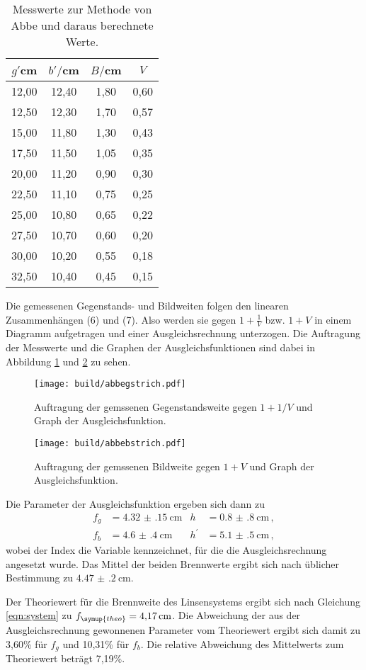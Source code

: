 \begin{table}[htp]
	\begin{center}
    \caption{Messwerte zur Methode von Abbe und daraus berechnete Werte.}
    \label{tab:abbe}
		\begin{tabular}{cccc}
		\toprule
			{$g'$cm} & {$b'/$cm} & {$B/$cm} & {$V$}\\
			\midrule
			12,00 & 12,40 & 1,80 & 0,60\\
			12,50 & 12,30 & 1,70 & 0,57\\
			15,00 & 11,80 & 1,30 & 0,43\\
			17,50 & 11,50 & 1,05 & 0,35\\
			20,00 & 11,20 & 0,90 & 0,30\\
			22,50 & 11,10 & 0,75 & 0,25\\
			25,00 & 10,80 & 0,65 & 0,22\\
			27,50 & 10,70 & 0,60 & 0,20\\
			30,00 & 10,20 & 0,55 & 0,18\\
			32,50 & 10,40 & 0,45 & 0,15\\
		\bottomrule
		\end{tabular}
	\end{center}
\end{table}

Die gemessenen Gegenstands- und Bildweiten folgen den linearen Zusammenhängen
(6) und (7). Also werden sie gegen $1+\frac{1}{V}$ bzw. $1+V$ in einem Diagramm
aufgetragen und einer Ausgleichsrechnung unterzogen. Die Auftragung der Messwerte
und die Graphen der Ausgleichsfunktionen sind dabei in Abbildung \ref{fig:gstrich}
und \ref{fig:bstrich} zu sehen.

\begin{figure}%
  \centering
  \texttt{[image: build/abbegstrich.pdf]}
  \caption{Auftragung der gemssenen Gegenstandsweite gegen $1+1/V$ und Graph der Ausgleichsfunktion.}
  \label{fig:gstrich}
\end{figure}

\begin{figure}%
  \centering
  \texttt{[image: build/abbebstrich.pdf]}
  \caption{Auftragung der gemssenen Bildweite gegen $1+V$ und Graph der Ausgleichsfunktion.}
  \label{fig:bstrich}
\end{figure}

Die Parameter der Ausgleichsfunktion ergeben sich dann zu
\begin{align*}
	f_g &= \SI{4.32(15)}{\centi\meter}		&		h &= \SI{0.8(8)}{\centi\meter} \,, \\
	f_b &= \SI{4.6(4)}{\centi\meter}		&		h^\prime &= \SI{5.1(5)}{\centi\meter}\,,
\end{align*}
wobei der Index die Variable kennzeichnet, für die die Ausgleichsrechnung
angesetzt wurde. Das Mittel der beiden Brennwerte ergibt sich nach üblicher
Bestimmung zu $\SI{4.47(20)}{\centi\meter}$.

Der Theoriewert für die Brennweite des Linsensystems ergibt sich nach Gleichung
\eqref{eqn:system} zu $f_{\symup{theo}}=\SI{4.17}{\centi\meter}$. Die Abweichung
der aus der Ausgleichsrechnung gewonnenen Parameter vom Theoriewert ergibt sich
damit zu 3,60\% für $f_g$ und 10,31\% für $f_b$. Die relative Abweichung des Mittelwerts
zum Theoriewert beträgt 7,19\%.
